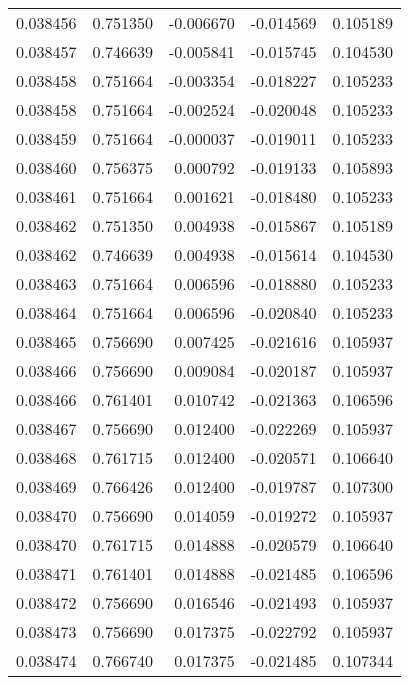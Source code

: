 \begin{tabular}{lrrrr}
0.038456    &  0.751350 & -0.006670 & -0.014569 &             0.105189 \\
0.038457    &  0.746639 & -0.005841 & -0.015745 &             0.104530 \\
0.038458    &  0.751664 & -0.003354 & -0.018227 &             0.105233 \\
0.038458    &  0.751664 & -0.002524 & -0.020048 &             0.105233 \\
0.038459    &  0.751664 & -0.000037 & -0.019011 &             0.105233 \\
0.038460    &  0.756375 &  0.000792 & -0.019133 &             0.105893 \\
0.038461    &  0.751664 &  0.001621 & -0.018480 &             0.105233 \\
0.038462    &  0.751350 &  0.004938 & -0.015867 &             0.105189 \\
0.038462    &  0.746639 &  0.004938 & -0.015614 &             0.104530 \\
0.038463    &  0.751664 &  0.006596 & -0.018880 &             0.105233 \\
0.038464    &  0.751664 &  0.006596 & -0.020840 &             0.105233 \\
0.038465    &  0.756690 &  0.007425 & -0.021616 &             0.105937 \\
0.038466    &  0.756690 &  0.009084 & -0.020187 &             0.105937 \\
0.038466    &  0.761401 &  0.010742 & -0.021363 &             0.106596 \\
0.038467    &  0.756690 &  0.012400 & -0.022269 &             0.105937 \\
0.038468    &  0.761715 &  0.012400 & -0.020571 &             0.106640 \\
0.038469    &  0.766426 &  0.012400 & -0.019787 &             0.107300 \\
0.038470    &  0.756690 &  0.014059 & -0.019272 &             0.105937 \\
0.038470    &  0.761715 &  0.014888 & -0.020579 &             0.106640 \\
0.038471    &  0.761401 &  0.014888 & -0.021485 &             0.106596 \\
0.038472    &  0.756690 &  0.016546 & -0.021493 &             0.105937 \\
0.038473    &  0.756690 &  0.017375 & -0.022792 &             0.105937 \\
0.038474    &  0.766740 &  0.017375 & -0.021485 &             0.107344 \\

\end{tabular}
